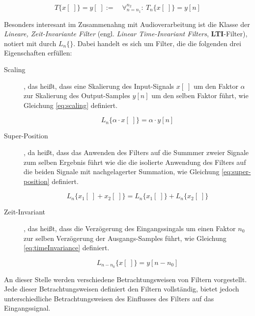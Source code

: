  \begin{equation}
T \{ x[\;] \} = y[\;] := \quad \mathop{\forall}_{n = n_1}^{n_2} :\ T_n\{x[\;]\} = y[n]
\label{eq:TransformationOperator}
\end{equation}


Besonders interesant im Zusammenahng mit Audioverarbeitung ist die Klasse der \emph{Lineare, Zeit-Invariante Filter} (engl. \emph{Linear Time-Invariant Filters}, \textbf{LTI}-Filter), notiert mit durch $L_n\{  \}$. Dabei handelt es sich um Filter, die die folgenden drei Eigenschaften erfüllen:

\begin{description}
	\item[Scaling], das heißt, dass eine Skalierung des Input-Signals $x[\;]$ um den Faktor $\alpha$ zur Skalierung des Output-Samples $y[n]$ um den selben Faktor führt, wie Gleichung \ref{eq:scaling} definiert.
	
	 \begin{equation}
	L_n\{ \alpha \cdot x[\;] \} = \alpha \cdot y[n]
	\label{eq:scaling}
	\end{equation}
	
	\item[Super-Position], da heißt, dass das Anwenden des Filters auf die Summmer zweier Signale zum selben Ergebnis führt wie die die isolierte Anwendung des Filters auf die beiden Signale mit nachgelagerter Summation, wie Gleichung \ref{eq:super-position} definiert. \cite[\glqq Linear Filters\grqq ]{introductionToFilters}
	
	 \begin{equation}
	L_n\{ x_1[\;] + x_2[\;] \} = L_n\{ x_1[\;]\}  + L_n\{ x_2[\;]\}
	\label{eq:super-position}
	\end{equation}
	
	\item[Zeit-Invariant], das heißt, dass die Verzögerung des Eingangssingals um einen Faktor $n_0$ zur selben Verzögerung der Ausgangs-Samples führt, wie Gleichung \ref{eq:timeInvariance} definiert.\cite[Filters III, S. 2 - 5 ]{dspMichiganSystems}
	
	 \begin{equation}
		L_{n-n_0}\{ x[\;] \} = y[n-n_0]
	\label{eq:timeInvariance}
	\end{equation}
	
\end{description}

An dieser Stelle werden verschiedene Betrachtungsweisen von Filtern vorgestellt. Jede dieser Betrachtungsweisen definiert den Filtern vollständig, bietet jedoch unterschiedliche Betrachtungsweisen des Einflusses des Filters auf das Eingangssignal. \cite[Filters III, S. 1 ]{dspMichiganSystems}

